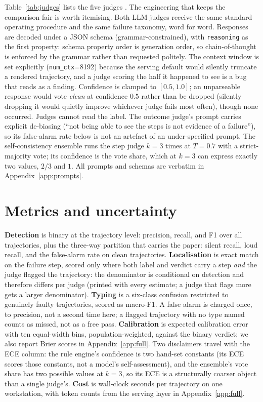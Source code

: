 \documentclass{article}
\begin{document}
Table~\ref{tab:judges} lists the five judges \citep{qwen2025qwen,dubey2024llama}. The
engineering that keeps the comparison fair is worth itemising. Both LLM judges receive the
same standard operating procedure and the same failure taxonomy, word for word. Responses are
decoded under a JSON schema (grammar-constrained), with \texttt{reasoning} as the first
property: schema property order is generation order, so chain-of-thought is enforced by the
grammar rather than requested politely. The context window is set explicitly
(\texttt{num\_ctx}=8192) because the serving default would silently truncate a rendered
trajectory, and a judge scoring the half it happened to see is a bug that reads as a finding.
Confidence is clamped to $[0.5, 1.0]$; an unparseable response would vote \emph{clean} at
confidence $0.5$ rather than be dropped (silently dropping it would quietly improve whichever
judge fails most often), though none occurred. Judges cannot read the label. The outcome
judge's prompt carries explicit de-biasing (``not being able to see the steps is not evidence
of a failure''), so its false-alarm rate below is not an artefact of an under-specified
prompt. The self-consistency ensemble \citep{wang2023selfconsistency} runs the step judge
$k{=}3$ times at $T{=}0.7$ with a strict-majority vote; its confidence is the vote share,
which at $k{=}3$ can express exactly two values, $2/3$ and $1$. All prompts and schemas are
verbatim in Appendix~\ref{app:prompts}.

\section{Metrics and uncertainty}
\label{sec:metrics}

\textbf{Detection} is binary at the trajectory level: precision, recall, and F1 over all
\tjNTraj{} trajectories, plus the three-way partition that carries the paper: silent recall,
loud recall, and the false-alarm rate on clean trajectories.
\textbf{Localisation} is exact match on the failure step, scored only where both label and
verdict carry a step \emph{and} the judge flagged the trajectory: the denominator is
conditional on detection and therefore differs per judge (printed with every estimate; a judge
that flags more gets a larger denominator).
\textbf{Typing} is a six-class confusion restricted to genuinely faulty trajectories, scored
as macro-F1. A false alarm is charged once, to precision, not a second time here; a flagged
trajectory with no type named counts as missed, not as a free pass.
\textbf{Calibration} is expected calibration error \citep{naeini2015obtaining} with ten
equal-width bins, population-weighted, against the binary verdict; we also report Brier
scores in Appendix~\ref{app:full}. Two disclaimers travel with the ECE column: the rule
engine's confidence is two hand-set constants (its ECE scores those constants, not a model's
self-assessment), and the ensemble's vote share has two possible values at $k{=}3$, so its
ECE is a structurally coarser object than a single judge's.
\textbf{Cost} is wall-clock seconds per trajectory on one workstation, with token counts
from the serving layer in Appendix~\ref{app:full}.
\end{document}
